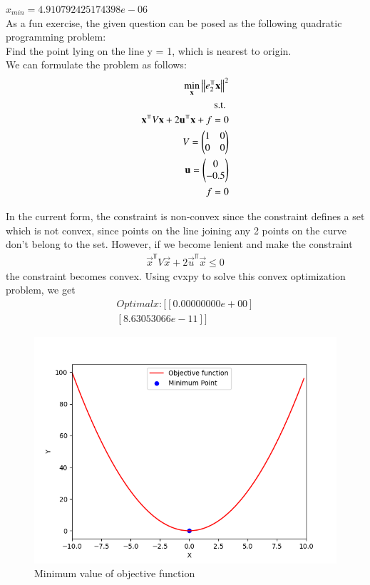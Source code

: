 \documentclass[journal]{IEEEtran}
\begin{document}
$x_{min} = 4.910792425174398e-06$\\
As a fun exercise, the given question can be posed as the following quadratic programming problem:\\
Find the point lying on the line y = 1, which is nearest to origin.
\\ We can formulate the problem as follows:
\begin{align}
    \min_{\vec{x}} \norm{e_2^{\Top}\vec{x}}^2\\
    \text{s.t. } \\ \vec{x}^{\Top}V\vec{x} + 2\vec{u}^{\Top}\vec{x} + f = 0\\
    V = \myvec{1 & 0 \\ 0 & 0}\\
    \vec{u} = \myvec{0 \\ -0.5}\\
    f = 0
\end{align}

In the current form, the constraint is non-convex since the constraint defines a set which is not convex, since points on the
line joining any 2 points on the curve don't belong to the set. However, if we become lenient and make the constraint
\begin{align}
    \vec{x}^{\Top}V\vec{x} + 2\vec{u}^{\Top}\vec{x} \le 0
\end{align}
the constraint becomes convex. Using cvxpy to solve this convex optimization problem, we get \\
\begin{align}
    Optimal x: [[0.00000000e+00]\\
 [8.63053066e-11]]
\end{align}
    

\begin{figure}[h!]
   \centering
   \includegraphics[width=0.7\columnwidth]{figs/fig.png}
    \caption{Minimum value of objective function}
\end{figure}
\end{document}
